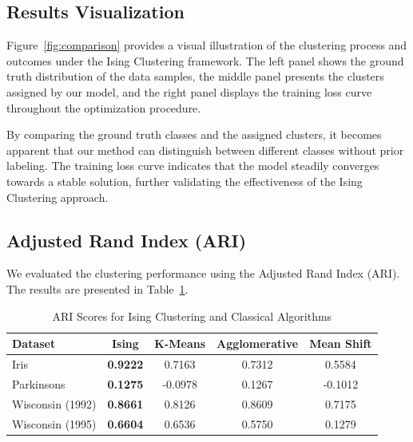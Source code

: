 \documentclass[journal]{IEEEtran}
\begin{document}
\subsection{Results Visualization}

Figure~\ref{fig:comparison} provides a visual illustration of the clustering process and outcomes under the Ising Clustering framework. The left panel shows the ground truth distribution of the data samples, the middle panel presents the clusters assigned by our model, and the right panel displays the training loss curve throughout the optimization procedure. 

By comparing the ground truth classes and the assigned clusters, it becomes apparent that our method can distinguish between different classes without prior labeling. The training loss curve indicates that the model steadily converges towards a stable solution, further validating the effectiveness of the Ising Clustering approach.


\subsection{Adjusted Rand Index (ARI)}

We evaluated the clustering performance using the Adjusted Rand Index (ARI). The results are presented in Table~\ref{tab:results}.



\begin{table}[h!]
\centering
\caption{ARI Scores for Ising Clustering and Classical Algorithms}
\label{tab:results}
\begin{tabular}{@{}lcccc@{}}
\toprule
\textbf{Dataset} & \textbf{Ising} & \textbf{K-Means} & \textbf{Agglomerative} & \textbf{Mean Shift} \\ \midrule
Iris & \textbf{0.9222} & 0.7163 & 0.7312 & 0.5584 \\
Parkinsons & \textbf{0.1275} & -0.0978 & 0.1267 & -0.1012 \\
Wisconsin (1992) & \textbf{0.8661} & 0.8126 & 0.8609 & 0.7175 \\
Wisconsin (1995) & \textbf{0.6604} & 0.6536 & 0.5750 & 0.1279 \\ \bottomrule
\end{tabular}
\end{table}
\end{document}
